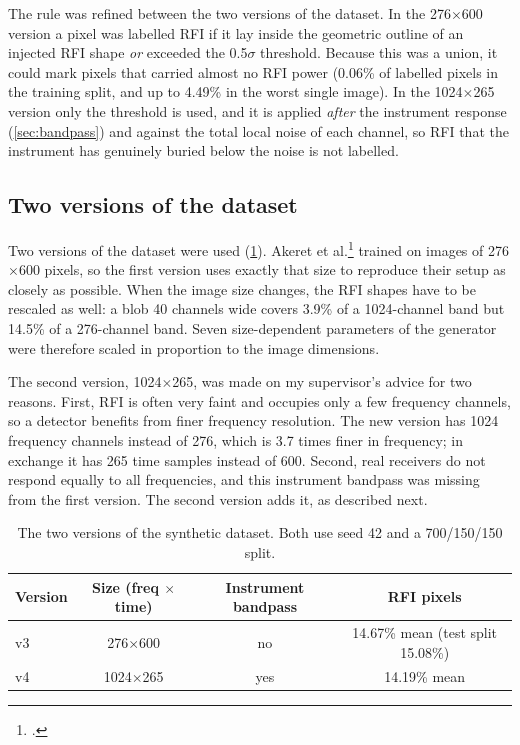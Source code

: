The rule was refined between the two versions of the dataset. In the
276$\times$600 version a pixel was labelled RFI if it lay inside the geometric
outline of an injected RFI shape \emph{or} exceeded the 0.5$\sigma$ threshold.
Because this was a union, it could mark pixels that carried almost no RFI
power (0.06\% of labelled pixels in the training split, and up to 4.49\% in
the worst single image). In the 1024$\times$265 version only the threshold is
used, and it is applied \emph{after} the instrument response
(\cref{sec:bandpass}) and against the total local noise of each channel, so
RFI that the instrument has genuinely buried below the noise is not
labelled.

\subsection{Two versions of the dataset}
\label{sec:synthetic_versions}
Two versions of the dataset were used (\cref{tab:synth_versions}). Akeret et
al.\footcite{akeret2017} trained \tfunet{} on images of 276$\times$600 pixels, so
the first version uses exactly that size to reproduce their setup as closely
as possible. When the image size changes, the RFI shapes have to be
rescaled as well: a blob 40 channels wide covers 3.9\% of a 1024-channel band
but 14.5\% of a 276-channel band. Seven size-dependent parameters of the
generator were therefore scaled in proportion to the image dimensions.

The second version, 1024$\times$265, was made on my supervisor's advice for
two reasons. First, RFI is often very faint and occupies only a few frequency
channels, so a detector benefits from finer frequency resolution. The new
version has 1024 frequency channels instead of 276, which is 3.7 times finer
in frequency; in exchange it has 265 time samples instead of 600. Second, real
receivers do not respond equally to all frequencies, and this instrument
bandpass was missing from the first version. The second version adds it, as
described next.

\begin{table}[H]
  \centering
  \caption{The two versions of the synthetic dataset. Both use seed 42 and a
    700/150/150 split.}
  \label{tab:synth_versions}
  \small
  \begin{tabular}{lccc}
    \toprule
    Version & Size (freq $\times$ time) & Instrument bandpass & RFI pixels \\
    \midrule
    v3 & 276$\times$600  & no  & 14.67\% mean (test split 15.08\%) \\
    v4 & 1024$\times$265 & yes & 14.19\% mean \\
    \bottomrule
  \end{tabular}
\end{table}


